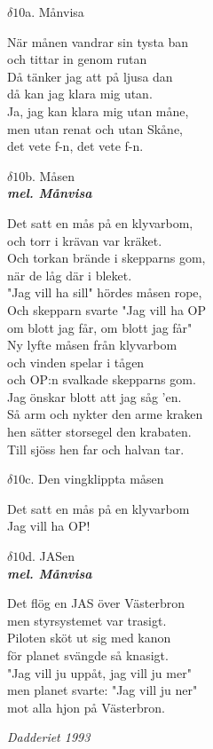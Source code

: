 \documentclass[a6paper,10pt]{article}
\newcommand{\mel}[1]{\small\textbf{\textit{mel. #1 \\}}}
\begin{document}
\setlength{\oddsidemargin}{-0.47in}
\noindent
\begin{center}
\Large $\delta10$a. Månvisa\\ 
\end{center}
När månen vandrar sin tysta ban \\
och tittar in genom rutan \\
Då tänker jag att på ljusa dan \\
då kan jag klara mig utan. \\
Ja, jag kan klara mig utan måne, \\
men utan renat och utan Skåne, \\
det vete f-n, det vete f-n. 
\begin{center}

\Large $\delta10$b. Måsen\\
\mel{Månvisa} 
\end{center}
Det satt en mås på en klyvarbom, \\
och torr i krävan var kräket. \\
Och torkan brände i skepparns gom, \\
när de låg där i bleket. \\
"Jag vill ha sill" hördes måsen rope, \\
Och skepparn svarte "Jag vill ha OP \\
om blott jag får, om blott jag får" 
\vspace{5pt}\\
Ny lyfte måsen från klyvarbom \\
och vinden spelar i tågen \\
och OP:n svalkade skepparns gom. \\
Jag önskar blott att jag såg 'en. \\
Så arm och nykter den arme kraken \\
hen sätter storsegel den krabaten. \\
Till sjöss hen far och halvan tar. 

\begin{center}
\Large $\delta10$c. Den vingklippta måsen\\ 
\end{center}
Det satt en mås på en klyvarbom\\
Jag vill ha OP! 

\newpage
\setlength{\oddsidemargin}{-0.37in}
\noindent
\begin{center}
\Large $\delta10$d. JASen\\ 
\mel{Månvisa}
\end{center}
Det flög en JAS över Västerbron \\
men styrsystemet var trasigt. \\
Piloten sköt ut sig med kanon \\
för planet svängde så knasigt. \\
"Jag vill ju uppåt, jag vill ju mer"\\
men planet svarte: "Jag vill ju ner"\\
mot alla hjon på Västerbron. 
\begin{flushright}
\textit{Dadderiet 1993}
\end{flushright}
\end{document}
